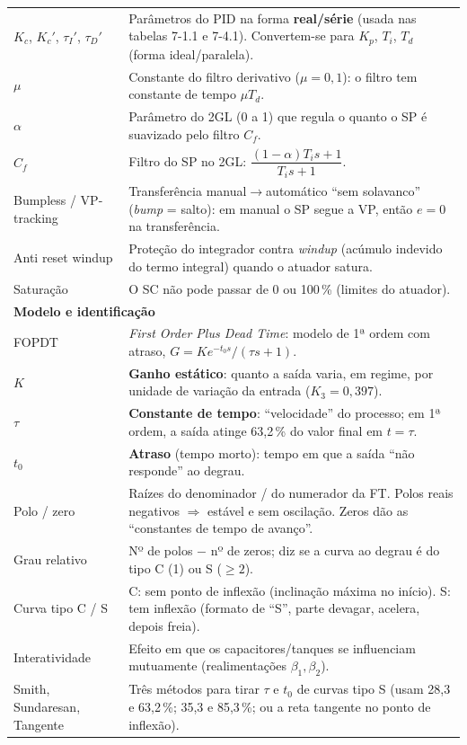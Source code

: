 \documentclass[11pt,a4paper]{article}
\begin{document}
\begin{center}
\begin{longtable}{p{2.7cm}p{12.3cm}}
$K_c$, $K_c'$, $\tau_I'$, $\tau_D'$ & Parâmetros do PID na forma \textbf{real/série} (usada nas tabelas 7-1.1 e 7-4.1). Convertem-se para $K_p$, $T_i$, $T_d$ (forma ideal/paralela).\\
$\mu$ & Constante do filtro derivativo ($\mu=0{,}1$): o filtro tem constante de tempo $\mu T_d$.\\
$\alpha$ & Parâmetro do 2GL (0 a 1) que regula o quanto o SP é suavizado pelo filtro $C_f$.\\
$C_f$ & Filtro do SP no 2GL: $\dfrac{(1-\alpha)T_is+1}{T_is+1}$.\\
Bumpless / VP-tracking & Transferência manual$\to$automático ``sem solavanco'' (\emph{bump} = salto): em manual o SP segue a VP, então $e=0$ na transferência.\\
Anti reset windup & Proteção do integrador contra \emph{windup} (acúmulo indevido do termo integral) quando o atuador satura.\\
Saturação & O SC não pode passar de 0 ou 100\,\% (limites do atuador).\\
\multicolumn{2}{l}{\textbf{Modelo e identificação}}\\
FOPDT & \emph{First Order Plus Dead Time}: modelo de 1ª ordem com atraso, $G=Ke^{-t_0s}/(\tau s+1)$.\\
$K$ & \textbf{Ganho estático}: quanto a saída varia, em regime, por unidade de variação da entrada ($K_3=0{,}397$).\\
$\tau$ & \textbf{Constante de tempo}: ``velocidade'' do processo; em 1ª ordem, a saída atinge 63,2\,\% do valor final em $t=\tau$.\\
$t_0$ & \textbf{Atraso} (tempo morto): tempo em que a saída ``não responde'' ao degrau.\\
Polo / zero & Raízes do denominador / do numerador da FT. Polos reais negativos $\Rightarrow$ estável e sem oscilação. Zeros dão as ``constantes de tempo de avanço''.\\
Grau relativo & Nº de polos $-$ nº de zeros; diz se a curva ao degrau é do tipo C (1) ou S ($\ge2$).\\
Curva tipo C / S & C: sem ponto de inflexão (inclinação máxima no início). S: tem inflexão (formato de ``S'', parte devagar, acelera, depois freia).\\
Interatividade & Efeito em que os capacitores/tanques se influenciam mutuamente (realimentações $\beta_1,\beta_2$).\\
Smith, Sundaresan, Tangente & Três métodos para tirar $\tau$ e $t_0$ de curvas tipo S (usam 28,3 e 63,2\,\%; 35,3 e 85,3\,\%; ou a reta tangente no ponto de inflexão).\\

\end{longtable}
\end{center}
\end{document}
